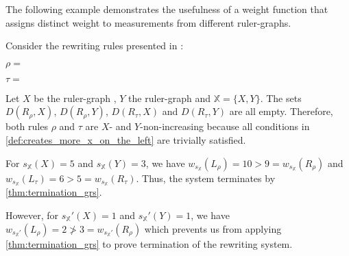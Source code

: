 The following example demonstrates the usefulness of a weight function that assigns distinct weight to measurements from different ruler-graphs.
\begin{example} 
    \label{ex:overbeek_5d6}
    Consider the rewriting rules presented in \cite[Example 5.6]{overbeek2024termination_lmcs}:
    \begin{center} 
      $\rho = $\scalebox{0.7} { }
    \end{center}
    \begin{center}
    $\tau = $\scalebox{0.7}{ 
    }
    \end{center}
     Let $X$ be the ruler-graph
    , $Y$ the ruler-graph
     and $\mathbb{X} = \{X, Y\}$.
    The sets $D(R_\rho, X)$, $D(R_\rho, Y)$, $D(R_\tau, X)$ and $D(R_\tau, Y)$ are all empty. Therefore, both rules $\rho$ and $\tau$ are $X$- and $Y$-non-increasing because all conditions in \autoref{def:creates_more_x_on_the_left} are trivially satisfied.
    
    For $s_\mathbb{X}(X) = 5$ and $s_\mathbb{X}(Y) = 3$, we have $
    w_{s_\mathbb{X}}(L_\rho) = 10 > 9 = w_{s_\mathbb{X}}(R_\rho)
    $ and $
    w_{s_\mathbb{X}}(L_\tau) = 6 > 5 = w_{s_\mathbb{X}}(R_\tau)$.
    Thus, the system terminates by \autoref{thm:termination_grs}.

  However, for $s_\mathbb{X}'(X) = 1$ and $s_\mathbb{X}'(Y) = 1$, we have
    \(
        w_{s_\mathbb{X}'}(L_\rho) = 2 \not > 3 = w_{s_\mathbb{X}'}(R_\rho)
    \) which prevents us from applying \autoref{thm:termination_grs} to prove termination of the rewriting system.
    
\end{example}

 
